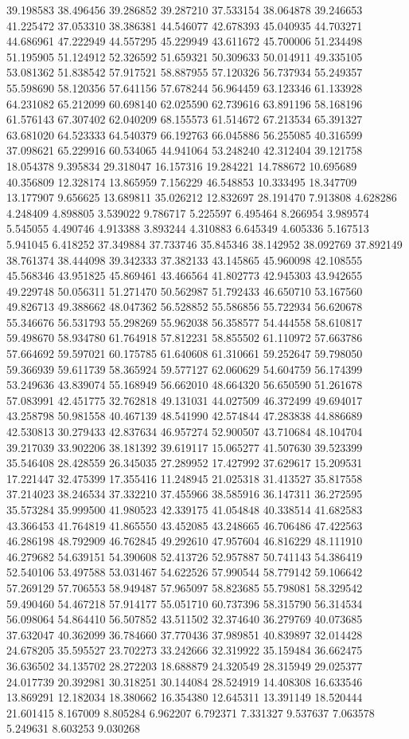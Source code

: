 39.198583
38.496456
39.286852
39.287210
37.533154
38.064878
39.246653
41.225472
37.053310
38.386381
44.546077
42.678393
45.040935
44.703271
44.686961
47.222949
44.557295
45.229949
43.611672
45.700006
51.234498
51.195905
51.124912
52.326592
51.659321
50.309633
50.014911
49.335105
53.081362
51.838542
57.917521
58.887955
57.120326
56.737934
55.249357
55.598690
58.120356
57.641156
57.678244
56.964459
63.123346
61.133928
64.231082
65.212099
60.698140
62.025590
62.739616
63.891196
58.168196
61.576143
67.307402
62.040209
68.155573
61.514672
67.213534
65.391327
63.681020
64.523333
64.540379
66.192763
66.045886
56.255085
40.316599
37.098621
65.229916
60.534065
44.941064
53.248240
42.312404
39.121758
18.054378
9.395834
29.318047
16.157316
19.284221
14.788672
10.695689
40.356809
12.328174
13.865959
7.156229
46.548853
10.333495
18.347709
13.177907
9.656625
13.689811
35.026212
12.832697
28.191470
7.913808
4.628286
4.248409
4.898805
3.539022
9.786717
5.225597
6.495464
8.266954
3.989574
5.545055
4.490746
4.913388
3.893244
4.310883
6.645349
4.605336
5.167513
5.941045
6.418252
37.349884
37.733746
35.845346
38.142952
38.092769
37.892149
38.761374
38.444098
39.342333
37.382133
43.145865
45.960098
42.108555
45.568346
43.951825
45.869461
43.466564
41.802773
42.945303
43.942655
49.229748
50.056311
51.271470
50.562987
51.792433
46.650710
53.167560
49.826713
49.388662
48.047362
56.528852
55.586856
55.722934
56.620678
55.346676
56.531793
55.298269
55.962038
56.358577
54.444558
58.610817
59.498670
58.934780
61.764918
57.812231
58.855502
61.110972
57.663786
57.664692
59.597021
60.175785
61.640608
61.310661
59.252647
59.798050
59.366939
59.611739
58.365924
59.577127
62.060629
54.604759
56.174399
53.249636
43.839074
55.168949
56.662010
48.664320
56.650590
51.261678
57.083991
42.451775
32.762818
49.131031
44.027509
46.372499
49.694017
43.258798
50.981558
40.467139
48.541990
42.574844
47.283838
44.886689
42.530813
30.279433
42.837634
46.957274
52.900507
43.710684
48.104704
39.217039
33.902206
38.181392
39.619117
15.065277
41.507630
39.523399
35.546408
28.428559
26.345035
27.289952
17.427992
37.629617
15.209531
17.221447
32.475399
17.355416
11.248945
21.025318
31.413527
35.817558
37.214023
38.246534
37.332210
37.455966
38.585916
36.147311
36.272595
35.573284
35.999500
41.980523
42.339175
41.054848
40.338514
41.682583
43.366453
41.764819
41.865550
43.452085
43.248665
46.706486
47.422563
46.286198
48.792909
46.762845
49.292610
47.957604
46.816229
48.111910
46.279682
54.639151
54.390608
52.413726
52.957887
50.741143
54.386419
52.540106
53.497588
53.031467
54.622526
57.990544
58.779142
59.106642
57.269129
57.706553
58.949487
57.965097
58.823685
55.798081
58.329542
59.490460
54.467218
57.914177
55.051710
60.737396
58.315790
56.314534
56.098064
54.864410
56.507852
43.511502
32.374640
36.279769
40.073685
37.632047
40.362099
36.784660
37.770436
37.989851
40.839897
32.014428
24.678205
35.595527
23.702273
33.242666
32.319922
35.159484
36.662475
36.636502
34.135702
28.272203
18.688879
24.320549
28.315949
29.025377
24.017739
20.392981
30.318251
30.144084
28.524919
14.408308
16.633546
13.869291
12.182034
18.380662
16.354380
12.645311
13.391149
18.520444
21.601415
8.167009
8.805284
6.962207
6.792371
7.331327
9.537637
7.063578
5.249631
8.603253
9.030268
